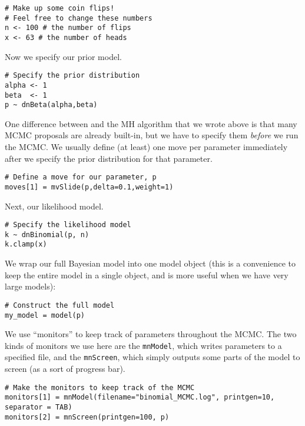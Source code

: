 {\tt \begin{snugshade*}
\begin{lstlisting}    
# Make up some coin flips!
# Feel free to change these numbers
n <- 100 # the number of flips
x <- 63	# the number of heads
\end{lstlisting}
\end{snugshade*}}

Now we specify our prior model.
{\tt \begin{snugshade*}
\begin{lstlisting}    
# Specify the prior distribution
alpha <- 1
beta  <- 1
p ~ dnBeta(alpha,beta)
\end{lstlisting}
\end{snugshade*}}

One difference between \RevBayes and the MH algorithm that we wrote above is that many MCMC proposals are already built-in, but we have to specify them \emph{before} we run the MCMC.
We usually define (at least) one move per parameter immediately after we specify the prior distribution for that parameter.

{\tt \begin{snugshade*}
\begin{lstlisting}    
# Define a move for our parameter, p
moves[1] = mvSlide(p,delta=0.1,weight=1)
\end{lstlisting}
\end{snugshade*}}

Next, our likelihood model.
{\tt \begin{snugshade*}
\begin{lstlisting}    
# Specify the likelihood model
k ~ dnBinomial(p, n)
k.clamp(x)
\end{lstlisting}
\end{snugshade*}}

We wrap our full Bayesian model into one model object (this is a convenience to keep the entire model in a single object, and is more useful when we have very large models):
{\tt \begin{snugshade*}
\begin{lstlisting}    
# Construct the full model
my_model = model(p)
\end{lstlisting}
\end{snugshade*}}

We use ``monitors'' to keep track of parameters throughout the MCMC.
The two kinds of monitors we use here are the \texttt{mnModel}, which writes parameters to a specified file, and the \texttt{mnScreen}, which simply outputs some parts of the model to screen (as a sort of progress bar).
{\tt \begin{snugshade*}
\begin{lstlisting}    
# Make the monitors to keep track of the MCMC
monitors[1] = mnModel(filename="binomial_MCMC.log", printgen=10, separator = TAB)
monitors[2] = mnScreen(printgen=100, p)
\end{lstlisting}
\end{snugshade*}}

